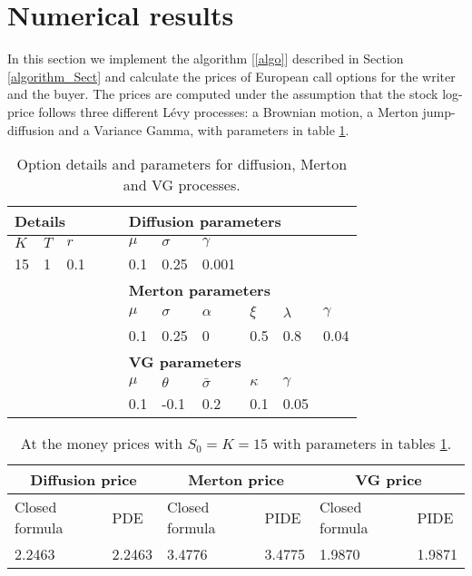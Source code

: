 \section{Numerical results}\label{numerical} 


In this section we implement the algorithm [\ref{algo}] described in Section \ref{algorithm_Sect} and calculate the prices of European call options for the writer and the buyer.
The prices are computed under the assumption that the stock log-price follows three different L\'evy processes: a Brownian motion, a Merton jump-diffusion and a Variance Gamma, with
parameters in table \ref{tab:parameters}.
\begin{table}[ht]
\centering
 \begin{tabular}[t]{*{11}l}
 \toprule
  \multicolumn{5}{l}{\textbf{Details}} & \multicolumn{6}{l}{\textbf{Diffusion parameters}} \\
  \midrule
  $K$ & $T$ & $r$ & & & $\mu$ & $\sigma$ & $\gamma$ \\
  15 & 1 & 0.1 & & & 0.1 & 0.25 & 0.001 \\
  \toprule
  \multicolumn{5}{l}{} & \multicolumn{6}{l}{\textbf{Merton parameters}} \\
  \midrule
  & & & & & $\mu$ & $\sigma$ & $\alpha$ &$\xi$ & $\lambda$ & $\gamma$\\
  & & & & & 0.1 & 0.25 & 0 & 0.5 & 0.8 & 0.04\\
  \toprule
  \multicolumn{5}{l}{} & \multicolumn{6}{l}{\textbf{VG parameters}} \\
  \midrule
  & & & & & $\mu$ & $\theta$ & $\bar \sigma$ &$\kappa$ & $\gamma$ \\
  & & & & & 0.1 & -0.1 & 0.2 & 0.1 & 0.05 \\
\bottomrule
\end{tabular}
  \caption{Option details and parameters for diffusion, Merton and VG processes.}
  \label{tab:parameters}
\end{table}

\begin{table}[ht]
\centering
\begin{tabular}[t]{llllll}
\toprule
  \multicolumn{2}{c}{\textbf{Diffusion price}} &  \multicolumn{2}{c}{\textbf{Merton price}} &  \multicolumn{2}{c}{\textbf{VG price}} \\
\midrule
Closed formula & PDE & Closed formula & PIDE & Closed formula & PIDE\\
2.2463 & 2.2463 & 3.4776 & 3.4775 & 1.9870 & 1.9871\\
\bottomrule
\end{tabular}
\caption{At the money prices with $S_0=K=15$ with parameters in tables \ref{tab:parameters}.}
\label{tab:ATM_price}
\end{table}%

